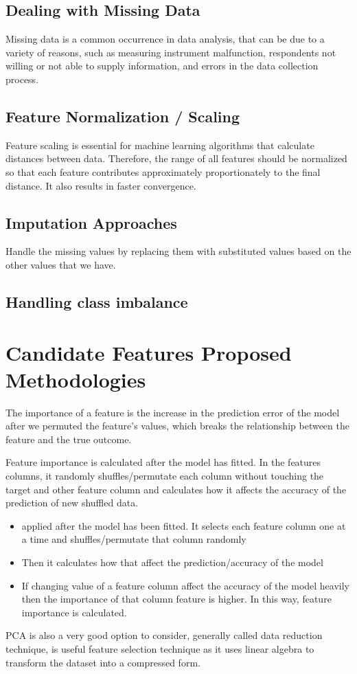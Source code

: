 \documentclass[5 pt]{article}
\begin{document}
\subsection{Dealing with Missing Data}
Missing data is a common occurrence in data analysis, that can be due to a variety of reasons, such as measuring instrument malfunction, respondents not willing or not able to supply information, and errors in the data collection process.

\subsection{Feature Normalization / Scaling}
Feature scaling is essential for machine learning algorithms that calculate distances between data. Therefore, the range of all features should be normalized so that each feature contributes approximately proportionately to the final distance. It also results in faster convergence.

\subsection{Imputation Approaches} 
Handle the missing values by replacing them with substituted values based on the other values that we have.

\subsection{Handling class imbalance}

\section{Candidate Features Proposed Methodologies}

The importance of a feature is the increase in the prediction error of the model after we permuted the feature's values, which breaks the relationship between the feature and the true outcome.

Feature importance is calculated after the model has fitted. In the features columns, it randomly shuffles/permutate each column without touching the target and other feature column and calculates how it affects the accuracy of the prediction of new shuffled data.
\begin{itemize}


\item applied after the model has been fitted. It selects each feature column one at a time and shuffles/permutate that column randomly
\item Then it calculates how that affect the prediction/accuracy of the model
\item If changing value of a feature column affect the accuracy of the model heavily then the importance of that column feature is higher. In this way, feature importance is calculated.

\end{itemize}
PCA is also a very good option to consider, generally called data reduction technique, is useful feature selection technique as it uses linear algebra to transform the dataset into a compressed form.\\
\end{document}
